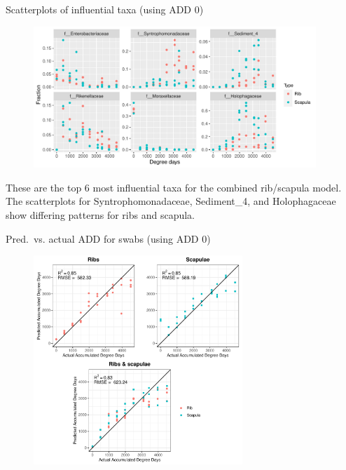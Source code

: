 \documentclass{beamer}
\begin{document}
\begin{frame}{Scatterplots of influential taxa (using ADD 0)}

  \begin{center}
    \begin{figure}
      \includegraphics[height=2.1in]
        {w_swabs/bacteria/use_families/both_ribs_scapulae/w_baseline/infl_combined_swab_w_baseline_family_scatter}
    \end{figure}
  \end{center}

  \vspace{0.15in}

  \footnotesize{ \noindent These are the top 6 most influential taxa for the
    combined rib/scapula model.  The scatterplots for Syntrophomonadaceae,
    Sediment\_4, and Holophagaceae show differing patterns for ribs and
    scapula.
    }

\end{frame}



\begin{frame}{Pred.\ vs. actual ADD for swabs (using ADD 0)}

  \begin{center}
    \begin{figure}
      \includegraphics[height=3.1in]
        {w_swabs/bacteria/use_families/hl_combined_family_w_baseline_predicted_vs_actual_ADD}
    \end{figure}
  \end{center}
    
\end{frame}
\end{document}
